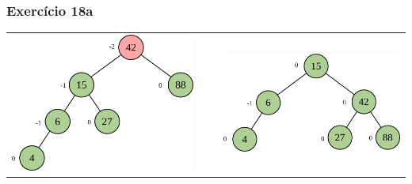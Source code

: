 \documentclass[aspectratio=169]{beamer}
\begin{document}
\begin{frame}[fragile]\frametitle{Exercício 18a}
\begin{tabular}{lll}
\includegraphics[height=0.45\paperheight]{imagens/avl15c.png} & ~ ~ &
\includegraphics[height=0.33\paperheight]{imagens/avl15d.png} \\
\end{tabular}
\end{frame}
\end{document}
